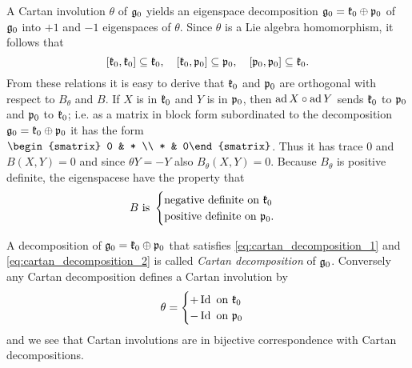 A Cartan involution $\theta$ of $\mathfrak{g}_0$ yields an eigenspace decomposition $\mathfrak{g}_0 = \mathfrak{k}_0 \oplus \mathfrak{p}_0$ of $\mathfrak{g}_0$ into $+1$ and $-1$ eigenspaces of $\theta$. Since $\theta$ is a Lie algebra homomorphism, it follows that
\begin{equation}\label{eq:cartan_decomposition_1}
 [\mathfrak{k}_0,\mathfrak{k}_0] \subseteq \mathfrak{k}_0, \quad[\mathfrak{k}_0,\mathfrak{p}_0] \subseteq \mathfrak{p}_0, \quad [\mathfrak{p}_0,\mathfrak{p}_0] \subseteq \mathfrak{k}_0.
\end{equation}
From these relations it is easy to derive that $\mathfrak{k}_0$ and $\mathfrak{p}_0$ are orthogonal with respect to $B_\theta$ and $B$. If $X$ is in $\mathfrak{k}_0$ and $Y$ is in $\mathfrak{p}_0$, then $\operatorname{\mathrm{ad}} X \circ \operatorname{\mathrm{ad}} Y $ sends $\mathfrak{k}_0$ to $\mathfrak{p}_0$ and $\mathfrak{p}_0$ to $\mathfrak{k}_0$; i.e. as a matrix in block form subordinated to the decomposition $\mathfrak{g}_0 = \mathfrak{k}_0 \oplus \mathfrak{p}_0$ it has the form $\begin{smatrix} 0 & * \\ * & 0\end{smatrix}$. Thus it has trace $0$ and $B(X,Y) = 0$ and since $\theta Y = - Y$ also $B_\theta (X,Y) = 0$. Because $B_\theta$ is positive definite, the eigenspacese have the property that
\begin{equation}\label{eq:cartan_decomposition_2}
 B \text{ is } \begin{cases} \text{negative definite on } \mathfrak{k}_0 \\ \text{positive definite on } \mathfrak{p}_0. \end{cases}
\end{equation}

A decomposition of $\mathfrak{g}_0 = \mathfrak{k}_0 \oplus \mathfrak{p}_0$ that satisfies \eqref{eq:cartan_decomposition_1} and \eqref{eq:cartan_decomposition_2} is called \emph{Cartan decomposition} of $\mathfrak{g}_0$. Conversely any Cartan decomposition defines a Cartan involution by
\[
\theta =
 \begin{cases}
  + \operatorname{\mathrm{Id}} \text{ on } \mathfrak{k}_0 \\
  - \operatorname{\mathrm{Id}} \text{ on } \mathfrak{p}_0
 \end{cases}
\]
and we see that Cartan involutions are in bijective correspondence with Cartan decompositions.

